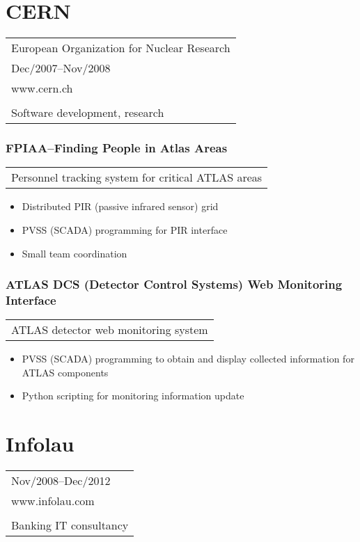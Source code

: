 \documentclass[a4paper,english]{article}
\begin{document}
\section*{CERN}
    \begin{tabular}{l}
        European Organization for Nuclear Research \\
        Dec/2007--Nov/2008 \\
        www.cern.ch \\
        \\
        Software development, research \\
    \end{tabular}
    \subsubsection*{FPIAA--Finding People in Atlas Areas}
    \begin{tabular}{l}
        Personnel tracking system for critical ATLAS areas \\
    \end{tabular}
    \begin{itemize}
    \setlength{\itemsep}{-1mm}
        \item[] Distributed PIR (passive infrared sensor) grid
        \item[] PVSS (SCADA) programming for PIR interface
        \item[] Small team coordination
    \end{itemize}
    \subsubsection*{ATLAS DCS (Detector Control Systems) Web Monitoring Interface}
    \begin{tabular}{l}
        ATLAS detector web monitoring system \\
    \end{tabular}
    \begin{itemize}
    \setlength{\itemsep}{-1mm}
        \item[] PVSS (SCADA) programming to obtain and display collected information for ATLAS components
        \item[] Python scripting for monitoring information update
    \end{itemize}
    \vspace{0.5cm}
\section*{Infolau}
    \begin{tabular}{l}
        Nov/2008--Dec/2012 \\
        www.infolau.com \\
        \\
        Banking IT consultancy \\
    \end{tabular}
\end{document}
